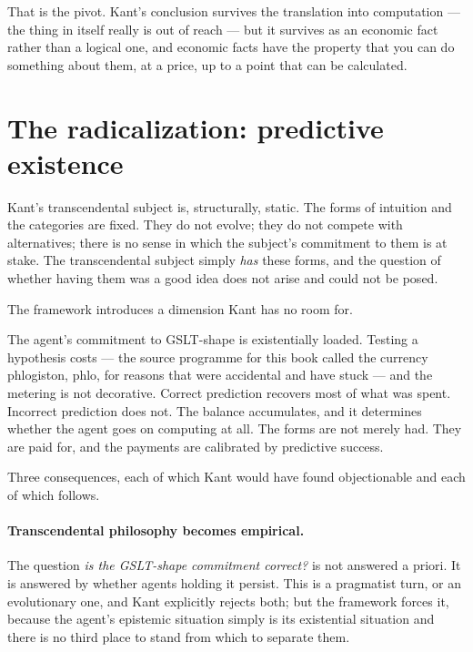 That is the pivot.
Kant's conclusion survives the translation into computation --- the
thing in itself really is out of reach --- but it survives as an
economic fact rather than a logical one, and economic facts have
the property that you can do something about them, at a price, up
to a point that can be calculated.

\section{The radicalization: predictive existence}
\label{sec:kant-radical}

Kant's transcendental subject is, structurally, static.
The forms of intuition and the categories are fixed.
They do not evolve; they do not compete with alternatives; there is
no sense in which the subject's commitment to them is at stake.
The transcendental subject simply \emph{has} these forms, and the
question of whether having them was a good idea does not arise and
could not be posed.

The framework introduces a dimension Kant has no room for.

The agent's commitment to GSLT-shape is existentially loaded.
Testing a hypothesis costs --- the source programme for this book
called the currency phlogiston, phlo, for reasons that were
accidental and have stuck --- and the metering is not decorative.
Correct prediction recovers most of what was spent.
Incorrect prediction does not.
The balance accumulates, and it determines whether the agent goes
on computing at all.
The forms are not merely had.
They are paid for, and the payments are calibrated by predictive
success.

Three consequences, each of which Kant would have found
objectionable and each of which follows.

\paragraph{Transcendental philosophy becomes empirical.}
The question \emph{is the GSLT-shape commitment correct?} is not
answered a priori.
It is answered by whether agents holding it persist.
This is a pragmatist turn, or an evolutionary one, and Kant
explicitly rejects both; but the framework forces it, because the
agent's epistemic situation simply is its existential situation and
there is no third place to stand from which to separate them.

